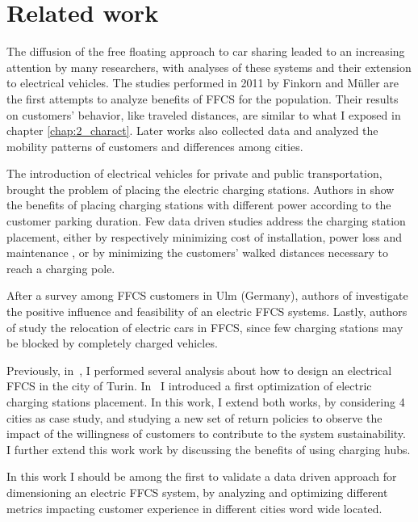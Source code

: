 \section{Related work}
\label{sec:related}

The diffusion of the free floating approach to car sharing leaded to an increasing attention by many researchers, with  analyses of
these systems and their extension to electrical vehicles. 
The studies performed  in 2011 by Finkorn and M\"{u}ller \cite{Firnkorn2011,FM12} are the first attempts to analyze benefits of FFCS for the population. Their results on customers' behavior, like traveled distances, are similar to what I exposed in chapter \ref{chap:2_charact}.
Later works \cite{Car2GoGlobalAnalysis,CSandSocial,Schmoller2015} also collected data and analyzed the mobility patterns of customers and differences among cities.

The introduction of electrical vehicles for private and public transportation, brought the problem of placing the electric charging stations. Authors in \cite{ChargingStationForVehicularNetworks} show the benefits of placing charging stations with different power according to the customer parking duration. 
Few data driven studies address the charging station placement, either by respectively minimizing  cost of installation, power loss and maintenance  \cite{PlacementAndPowergrid,mipCSPpechino}, or by minimizing the customers' walked distances necessary to reach a charging pole\cite{placementAustin}. 

After a survey among FFCS customers in Ulm (Germany), authors of \cite{FM15}  investigate the positive influence and feasibility of an electric FFCS systems.
Lastly, authors of \cite{WB15} study the relocation of electric cars in FFCS, since few charging stations may be blocked by completely charged vehicles. 

Previously, in~\cite{taormina}, I performed several analysis about how to design an electrical FFCS in the city of Turin. In~\cite{maui} I introduced a first optimization of electric charging stations placement. In this work, I extend both works, by considering 4 cities as case study, and studying a new set of return policies to observe the impact of the willingness of customers to contribute to the system sustainability. I further extend this work work by discussing the benefits of using charging hubs.

In this work I should be among the first to validate a data driven approach for dimensioning an electric FFCS system, by analyzing and optimizing different metrics impacting customer experience in different cities word wide located.


